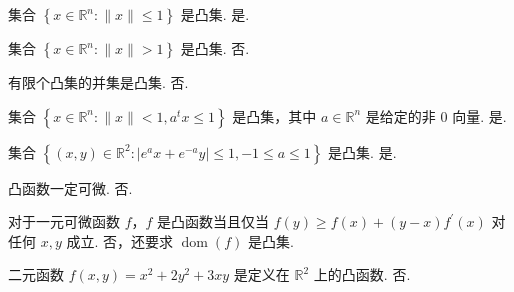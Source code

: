 

\usepackage{tikz}

\newcommand{\Title}{CVX final 2021}
\renewcommand{\due}{due: 11 weeks}
\newcommand{\tr}{\operatorname{tr}} %
\newcommand{\dom}{\operatorname{dom}} %
\newcommand{\minimize}{\operatorname{minimize}} %
\newcommand{\subject}{\operatorname{subject\ to}}

\newcommand{\todo}{{\color{red} to do}} %
\newcommand{\myline}{{\line(1,0){450}}} %




\begin{problem}[判断]
    集合 $\left\{x \in \mathbb{R}^n: \|x\| \le 1\right\}$ 是凸集.
    \Answer 是.
\end{problem}

\begin{problem}[判断]
    集合 $\left\{x \in \mathbb{R}^n: \|x\| > 1\right\}$ 是凸集.
    \Answer 否.
\end{problem}

\begin{problem}[判断]
    有限个凸集的并集是凸集.
    \Answer 否.
\end{problem}

\begin{problem}[判断]
    集合 $\left\{x \in \mathbb{R}^n: \|x\| < 1, a^tx \le 1\right\}$ 是凸集，其中 $a \in \mathbb{R}^n$ 是给定的非 0 向量.
    \Answer 是.
\end{problem}

\begin{problem}[判断]
    集合 $\left\{(x, y) \in \mathbb{R}^2: |e^ax + e^{-a}y| \le 1, -1 \le a \le 1\right\}$ 是凸集.
    \Answer 是.
\end{problem}

\begin{problem}[判断]
    凸函数一定可微.
    \Answer 否.
\end{problem}

\begin{problem}[判断]
    对于一元可微函数 $f$，$f$ 是凸函数当且仅当 $f(y) \ge f(x) + (y - x)f^\prime(x)$ 对任何 $x, y$ 成立.
    \Answer 否，还要求 $\dom(f)$ 是凸集.
\end{problem}

\begin{problem}[判断]
    二元函数 $f(x, y) = x^2 + 2y^2 + 3xy$ 是定义在 $\mathbb{R}^2$ 上的凸函数.
    \Answer 否.
\end{problem}

